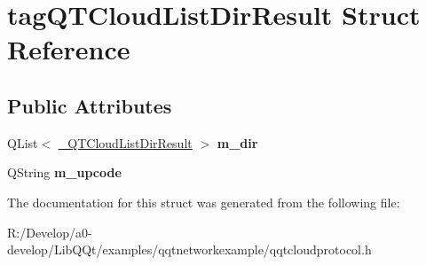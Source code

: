 \hypertarget{structtag_q_t_cloud_list_dir_result}{}\section{tag\+Q\+T\+Cloud\+List\+Dir\+Result Struct Reference}
\label{structtag_q_t_cloud_list_dir_result}
\subsection*{Public Attributes}
\begin{DoxyCompactItemize}
\item 
\mbox{\label{structtag_q_t_cloud_list_dir_result_a5fada41574aed586ae943f80a0c1b323}} 
Q\+List$<$ \mbox{\hyperlink{structtag___q_t_cloud_list_dir_result}{\+\_\+\+Q\+T\+Cloud\+List\+Dir\+Result}} $>$ {\bfseries m\+\_\+dir}
\item 
\mbox{\label{structtag_q_t_cloud_list_dir_result_a97009d6d1fb3306a1bf994042bd75905}} 
Q\+String {\bfseries m\+\_\+upcode}
\end{DoxyCompactItemize}


The documentation for this struct was generated from the following file\+:\begin{DoxyCompactItemize}
\item 
R\+:/\+Develop/a0-\/develop/\+Lib\+Q\+Qt/examples/qqtnetworkexample/qqtcloudprotocol.\+h\end{DoxyCompactItemize}

